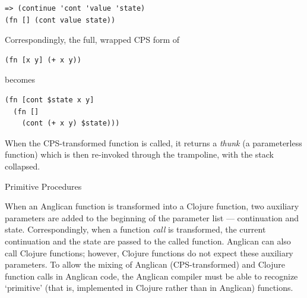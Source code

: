 \documentclass[preprint]{sigplanconf}
\begin{document}
\begin{lstlisting}[style=default]
=> (continue 'cont 'value 'state)
(fn [] (cont value state))
\end{lstlisting}
Correspondingly, the full, wrapped CPS form of
\begin{lstlisting}[style=default]
(fn [x y] (+ x y))
\end{lstlisting}
becomes
\begin{lstlisting}[style=default]
(fn [cont $state x y]
  (fn []
    (cont (+ x y) $state)))
\end{lstlisting}
When the CPS-transformed function is called, it returns a
\textit{thunk} (a parameterless function) which is then
re-invoked through the trampoline, with the stack collapsed.

\iftoggle{full}{%

}{%
}%

\iftoggle{full}{\subsubsection}{\subsection}{Primitive Procedures}
\label{seq:primitive}

When an Anglican function is transformed into a Clojure
function\iftoggle{full}{ by \texttt{fn-cps}}{}, two auxiliary
parameters are added to the beginning of the parameter list ---
continuation and state.  Correspondingly, when a function
\textit{call} is transformed\iftoggle{full}{ (by
\texttt{cps-of-application} or \texttt{cps-of-apply})}{}, the
current continuation and the state are passed to the called
function. Anglican can also call Clojure functions; however,
Clojure functions do not expect these auxiliary parameters.
To allow the mixing of Anglican (CPS-transformed) and Clojure
function calls in Anglican code, the Anglican compiler must be
able to recognize `primitive' (that is, implemented in Clojure
rather than in Anglican) functions.
\end{document}
